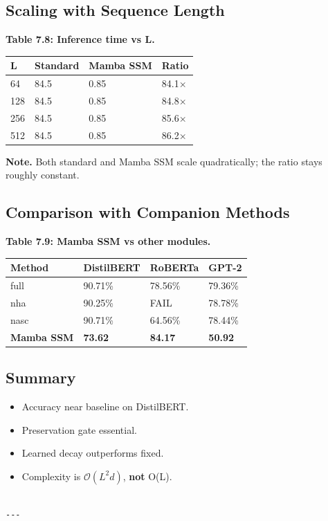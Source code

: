 \subsection{Scaling with Sequence Length}

\textbf{Table 7.8: Inference time vs L.}

\begin{table}[H]
\centering
\small
\begin{tabular}{llll}
\toprule
\textbf{L} & \textbf{Standard} & \textbf{Mamba SSM} & \textbf{Ratio} \\
\midrule
64 & 84.5 & 0.85 & 84.1$\times$ \\
128 & 84.5 & 0.85 & 84.8$\times$ \\
256 & 84.5 & 0.85 & 85.6$\times$ \\
512 & 84.5 & 0.85 & 86.2$\times$ \\
\bottomrule
\end{tabular}
\end{table}

\textbf{Note.} Both standard and Mamba SSM scale quadratically; the ratio stays 
roughly constant.

\subsection{Comparison with Companion Methods}

\textbf{Table 7.9: Mamba SSM vs other modules.}

\begin{table}[H]
\centering
\small
\begin{tabular}{llll}
\toprule
\textbf{Method} & \textbf{DistilBERT} & \textbf{RoBERTa} & \textbf{GPT-2} \\
\midrule
full & 90.71\% & 78.56\% & 79.36\% \\
nha & 90.25\% & FAIL & 78.78\% \\
nasc & 90.71\% & 64.56\% & 78.44\% \\
\textbf{Mamba SSM} & \textbf{73.62} & \textbf{84.17} & \textbf{50.92} \\
\bottomrule
\end{tabular}
\end{table}

\subsection{Summary}

\begin{itemize}
\item Accuracy near baseline on DistilBERT.
\item Preservation gate essential.
\item Learned decay outperforms fixed.
\item Complexity is $\mathcal{O}(L^2 d)$, \textbf{not} O(L).
\end{itemize}
\begin{lstlisting}

---
\end{lstlisting}

